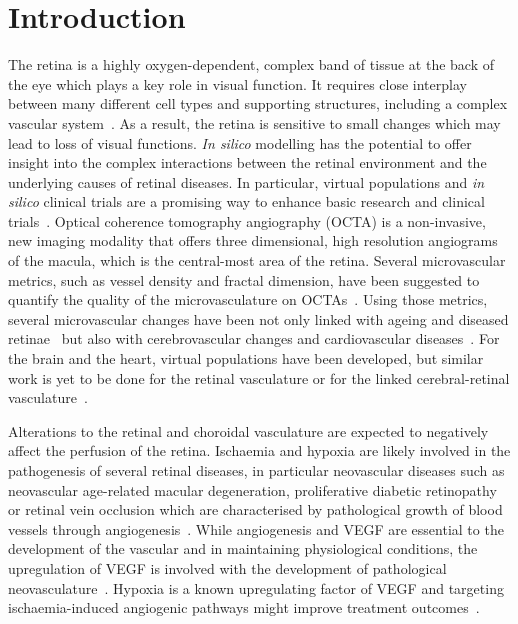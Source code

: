 \documentclass[11pt,]{article}
\begin{document}
\section{Introduction}\label{introduction}

The retina is a highly oxygen-dependent, complex band of tissue at the back of the eye which plays a key role in visual function.
It requires close interplay between many different cell types and supporting structures, including a complex vascular system~\cite{Hernandez2023}.
As a result, the retina is sensitive to small changes which may lead to loss of visual functions.
\textit{In silico} modelling has the potential to offer insight into the complex interactions between the retinal environment and the underlying causes of retinal diseases.
In particular, virtual populations and \textit{in silico} clinical trials are a promising way to enhance basic research and clinical trials~\cite{Hernandez2023}.
Optical coherence tomography angiography (OCTA) is a non-invasive, new imaging modality that offers three dimensional, high resolution angiograms of the macula, which is the central-most area of the retina.
Several microvascular metrics, such as vessel density and fractal dimension, have been suggested to quantify the quality of the microvasculature on OCTAs~\cite{Chu2016}.
Using those metrics, several microvascular changes have been not only linked with ageing and diseased retinae~\cite{ElBouri_2021,Ma2021,Trinh_2019,Told2023,Xue_2021} but also with cerebrovascular changes and cardiovascular diseases~\cite{Pleouras_2021,Graff_2021,LopezCuenca_2022}.
For the brain and the heart, virtual populations have been developed, but similar work is yet to be done for the retinal vasculature or for the linked cerebral-retinal vasculature~\cite{Hernandez2023}.

Alterations to the retinal and choroidal vasculature are expected to negatively affect the perfusion of the retina.
Ischaemia and hypoxia are likely involved in the pathogenesis of several retinal diseases, in
particular neovascular diseases such as neovascular age-related
macular degeneration, proliferative diabetic retinopathy or retinal
vein occlusion which are characterised by pathological growth of blood
vessels through angiogenesis~\cite{Medina_2016}.
While angiogenesis and VEGF are essential to the development of the vascular and in maintaining physiological conditions, the upregulation of VEGF is involved with the development of pathological neovasculature~\cite{Fruttiger_2007,Nishinaka_2018}. 
Hypoxia is a known upregulating factor of VEGF and targeting ischaemia-induced angiogenic pathways might improve treatment outcomes~\cite{UsuiOuchi2020}.
\end{document}
